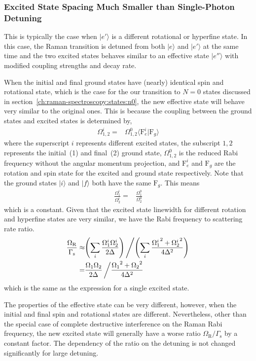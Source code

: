 \subsubsection{Excited State Spacing Much Smaller than Single-Photon Detuning}
\label{ch:raman-transfer:raman:extra-ext:tight-spacing}
This is typically the case when $|e'\rangle$ is a different rotational or hyperfine state.
In this case, the Raman transition is detuned from both $|e\rangle$ and $|e'\rangle$
at the same time and the two excited states behaves similar to an effective state $|e''\rangle$
with modified coupling strengths and decay rate.

When the initial and final ground states have (nearly) identical spin and rotational state,
which is the case for the our transition to $N=0$ states
discussed in section~\ref{ch:raman-spectroscopy:states:n0},
the new effective state will behave very similar to the original ones.
This is because the coupling between the ground states and excited states is determined by,
\begin{align*}
  \Omega_{1,2}^{i}=&\Omega_{1,2}^{0}\langle\mathrm{F}_e^i|\mathrm{F}_g\rangle
\end{align*}
where the superscript $i$ represents different excited states,
the subscript $1,2$ represents the initial~(1) and final~(2) ground state,
$\Omega_{1,2}^{0}$ is the reduced Rabi frequency without the angular momentum projection,
and $\mathrm{F}_e^i$ and $\mathrm{F}_g$ are the rotation and spin state for the excited
and ground state respectively. Note that the ground states $|i\rangle$ and $|f\rangle$
both have the same $\mathrm{F}_g$. This means
\begin{align*}
  \frac{\Omega_1^{i}}{\Omega_2^{i}}=&\frac{\Omega_1^{0}}{\Omega_2^{0}}
\end{align*}
which is a constant.
Given that the excited state linewidth for different rotation and hyperfine states
are very similar, we have the Rabi frequency to scattering rate ratio.
\begin{align*}
  \frac{\Omega_{\mathrm{R}}}{\Gamma_{\mathrm{s}}}\approx&{\left({\sum_i\frac{\Omega_1^i\Omega_2^i}{2\Delta}}\right)}\left/{\left({\sum_i\frac{{\Omega_1^i}^2+{\Omega_2^i}^2}{4\Delta^2}}\right)}\right.\\
  =&\frac{\Omega_1\Omega_2}{2\Delta}\left/\frac{{\Omega_1}^2+{\Omega_2}^2}{4\Delta^2}\right.
\end{align*}
which is the same as the expression for a single excited state.

The properties of the effective state can be very different, however,
when the initial and final spin and rotational states are different.
Nevertheless, other than the special case of complete destructive interference
on the Raman Rabi frequency,
the new excited state will generally have a worse ratio $\Omega_{\mathrm{R}}/\Gamma_{\mathrm{s}}$
by a constant factor.
The dependency of the ratio on the detuning is not changed significantly
for large detuning.

